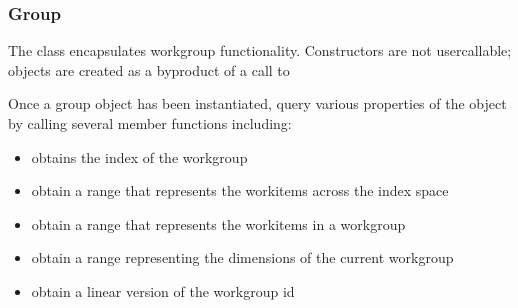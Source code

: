 \documentclass[letterpaper,10pt,english]{sphinxmanual}
\begin{document}
\begin{fulllineitems}

\begin{fulllineitems}
\label{\detokenize{programming-interface/parallelism/nd-item:_CPPv4IDpENK7nd_item8wait_forEvDp7eventTN}}%
\pysigstartmultiline
{}%
\pysigstopmultiline
\end{fulllineitems}


\end{fulllineitems}



\subsubsection{Group}
\label{\detokenize{programming-interface/parallelism/group:group}}\label{\detokenize{programming-interface/parallelism/group:id1}}\label{\detokenize{programming-interface/parallelism/group::doc}}
The  class encapsulates work\sphinxhyphen{}group functionality. Constructors
are not user\sphinxhyphen{}callable; objects are created as a by\sphinxhyphen{}product of a call to

Once a group object has been instantiated, query various properties of
the object by calling several member functions including:
\begin{itemize}
\item {} 
 \textendash{} obtains the index of the work\sphinxhyphen{}group

\item {} 
 \textendash{} obtain a range that represents the work\sphinxhyphen{}items
across the index space

\item {} 
 \textendash{} obtain a range that represents the work\sphinxhyphen{}items
in a work\sphinxhyphen{}group

\item {} 
 \textendash{} obtain a range representing the dimensions of
the current work\sphinxhyphen{}group

\item {} 
 \textendash{} obtain a linear version of the work\sphinxhyphen{}group id

\end{itemize}
\end{document}

